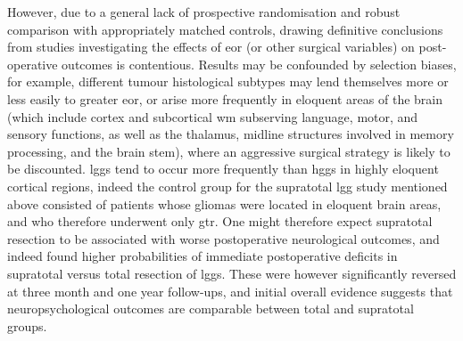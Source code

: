 However, due to a general lack of prospective randomisation and robust comparison with appropriately matched controls, drawing definitive conclusions from studies investigating the effects of \gls{eor} (or other surgical variables) on post-operative outcomes is contentious\autocite{deLeeuw2019,Keles2001}.
Results may be confounded by selection biases, for example, different tumour histological subtypes may lend themselves more or less easily to greater \gls{eor}, or arise more frequently in eloquent areas of the brain (which include cortex and subcortical \gls{wm} subserving language, motor, and sensory functions, as well as the thalamus, midline structures involved in memory processing, and the brain stem), where an aggressive surgical strategy is likely to be discounted\autocite{deLeeuw2019}.
\Glspl{lgg} tend to occur more frequently than \glspl{hgg} in highly eloquent cortical regions\autocite{Duffau2004}, indeed the control group for the supratotal \gls{lgg} study\autocite{Yordanova2011} mentioned above consisted of patients whose gliomas were located in eloquent brain areas, and who therefore underwent only \gls{gtr}.
One might therefore expect supratotal resection to be associated with worse postoperative neurological outcomes, and indeed \textcite{Rossi2019a} found higher probabilities of immediate postoperative deficits in supratotal versus total resection of \glspl{lgg}.
These were however significantly reversed at three month and one year follow-ups, and initial overall evidence suggests that neuropsychological outcomes are comparable between total and supratotal groups\autocite{Tabor2021}.

